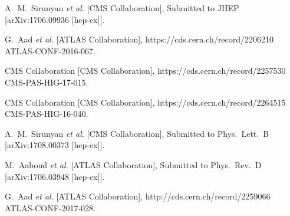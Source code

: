 \documentclass[10pt]{article}
\begin{document}
\begin{thebibliography}{99}
  A.~M.~Sirunyan {\it et al.} [CMS Collaboration],
  Submitted to JHEP
  [arXiv:1706.09936 [hep-ex]].


  G.~Aad {\it et al.}  [ATLAS Collaboration],
  https://cds.cern.ch/record/2206210
  ATLAS-CONF-2016-067.


  CMS Collaboration  [CMS Collaboration],
  https://cds.cern.ch/record/2257530
  CMS-PAS-HIG-17-015.


  CMS Collaboration  [CMS Collaboration],
  https://cds.cern.ch/record/2264515
  CMS-PAS-HIG-16-040.


  A.~M.~Sirunyan {\it et al.} [CMS Collaboration],
  Submitted to Phys.\ Lett.\ B
  [arXiv:1708.00373 [hep-ex]].


  M.~Aaboud {\it et al.} [ATLAS Collaboration],
  Submitted to Phys.\ Rev.\ D
  [arXiv:1706.03948 [hep-ex]].


  G.~Aad {\it et al.}  [ATLAS Collaboration],
  http://cds.cern.ch/record/2259066
  ATLAS-CONF-2017-028.


\end{thebibliography}

 
\end{document}
